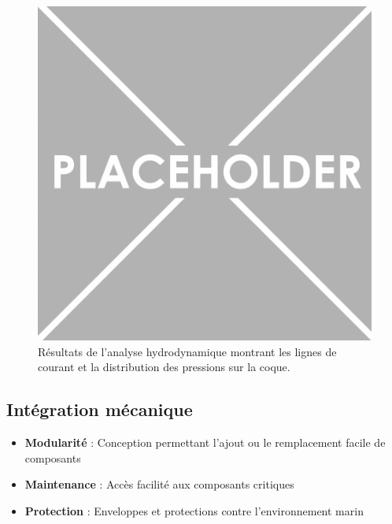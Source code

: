 {\begin{figure}[!htpb]
    \centering
    \includegraphics[width=0.8\linewidth]{Figures/PezizaTuberosa.jpg}
    \caption[Analyse hydrodynamique]{Résultats de l'analyse hydrodynamique montrant les lignes de courant et la distribution des pressions sur la coque.}
    \label{fig:analyse-hydrodynamique}
\end{figure}

\subsection{Intégration mécanique}
\begin{itemize}
    \setlength{\itemsep}{.375em}
    \item \textbf{Modularité} : Conception permettant l'ajout ou le remplacement facile de composants
    \item \textbf{Maintenance} : Accès facilité aux composants critiques
    \item \textbf{Protection} : Enveloppes et protections contre l'environnement marin
\end{itemize}

}
